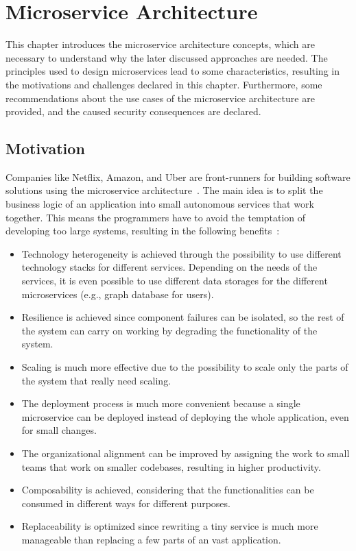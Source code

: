 \chapter{Microservice Architecture}
\label{cha:Microservice_Architecture}
This chapter introduces the microservice architecture concepts, which are necessary to understand why the later discussed approaches are needed.
The principles used to design microservices lead to some characteristics, resulting in the motivations and challenges declared in this chapter.
Furthermore, some recommendations about the use cases of the microservice architecture are provided, and the caused security consequences are declared.

\section{Motivation}
Companies like Netflix, Amazon, and Uber are front-runners for building software solutions using the microservice architecture~\cite{dias2020microservices}.
The main idea is to split the business logic of an application into small autonomous services that work together.
This means the programmers have to avoid the temptation of developing too large systems, resulting in the following benefits~\cite{newman2021building}:
\begin{itemize}
    \item Technology heterogeneity is achieved through the possibility to use different technology stacks for different services. 
		Depending on the needs of the services,	it is even possible to use different data storages for the different microservices (e.g., graph database for users).
    \item Resilience is achieved since component failures can be isolated, so the rest of the system can carry on working by degrading the functionality of the system. 
    \item Scaling is much more effective due to the possibility to scale only the parts of the system that really need scaling.
    \item The deployment process is much more convenient because a single microservice can be deployed instead of deploying the whole application, even for small changes.
    \item The organizational alignment can be improved by assigning the work to small teams that work on smaller codebases, resulting in higher productivity.
    \item Composability is achieved, considering that the functionalities can be consumed in different ways for different purposes.
    \item Replaceability is optimized since rewriting a tiny service is much more manageable than replacing a few parts of an vast application.
\end{itemize}

